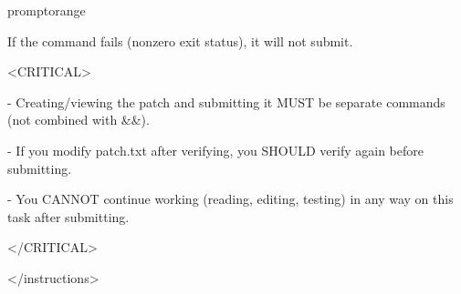 \begin{promptbox}{promptorange}
{\textasciigrave{}\textasciigrave{}\textasciigrave{}\par
\vspace{0.35em}\par
If the command fails (nonzero exit status), it will not submit.\par
\vspace{0.35em}\par
\textless{}CRITICAL\textgreater{}\par
- Creating/viewing the patch and submitting it MUST be separate commands (not combined with \&\&).\par
- If you modify patch.txt after verifying, you SHOULD verify again before submitting.\par
- You CANNOT continue working (reading, editing, testing) in any way on this task after submitting.\par
\textless{}/CRITICAL\textgreater{}\par
\textless{}/instructions\textgreater{}\par
}
\end{promptbox}

